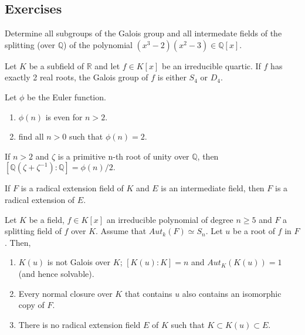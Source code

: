 \subsection{Exercises}

\begin{problem}[Hungerford 5.4.11]
\label{prob:1.1}
Determine all subgroups of the Galois group and all intermedate fields of the splitting (over $\mathbb{Q}$) of the polynomial $(x^{3}-2)(x^{2}-3)\in \mathbb{Q}[x]$.
\end{problem}

\begin{problem}[Hungerford 5.4.12]
\label{prob:1.1}
Let $K$ be a subfield of $\mathbb{R}$ and let $f \in K[x]$ be an irreducible quartic. If $f$ has exactly 2 real roots, the Galois group of $f$ is either $S_{4}$ or $D_{4}$.
\end{problem}

\begin{problem}[Hungerford 5.8.3]
\label{prob:1.1}
Let $\phi$ be the Euler function.
\begin{enumerate}
    \item $\phi(n)$ is even for $n>2$.
    \item find all $n>0$ such that $\phi(n)=2$.
\end{enumerate}
\end{problem}

\begin{problem}[Hungerford 5.8.9]
\label{prob:1.1}
If $n>2$ and $\zeta$ is a primitive n-th root of unity over $\mathbb{Q}$, then $[\mathbb{Q}(\zeta + \zeta^{-1}): \mathbb{Q}]=\phi(n)/2.$
\end{problem}

\begin{problem}[Hungerford 5.9.1]
\label{prob:1.1}
If $F$ is a radical extension field of $K$ and $E$ is an intermediate field, then $F$ is a radical extension of $E$.
\end{problem}

\begin{problem}[Hungerford 5.9.3]
\label{prob:1.1}
Let $K$ be a field, $f\in K[x]$ an irreducible polynomial of degree $n\geq 5$ and $F$ a splitting field of $f$ over $K$. Assume that $Aut_{k}(F)\simeq S_{n}$. Let $u$ be a root of $f$ in $F$. Then,
\begin{enumerate}
    \item $K(u)$ is not Galois over $K$; $[K(u):K]=n$ and $Aut_{K}(K(u))=1$ (and hence solvable).
    \item Every normal closure over $K$ that contains $u$ also contains an isomorphic copy of $F$.
    \item There is no radical extension field $E$ of $K$ such that $K\subset K(u)\subset E$.
\end{enumerate}
\end{problem}


